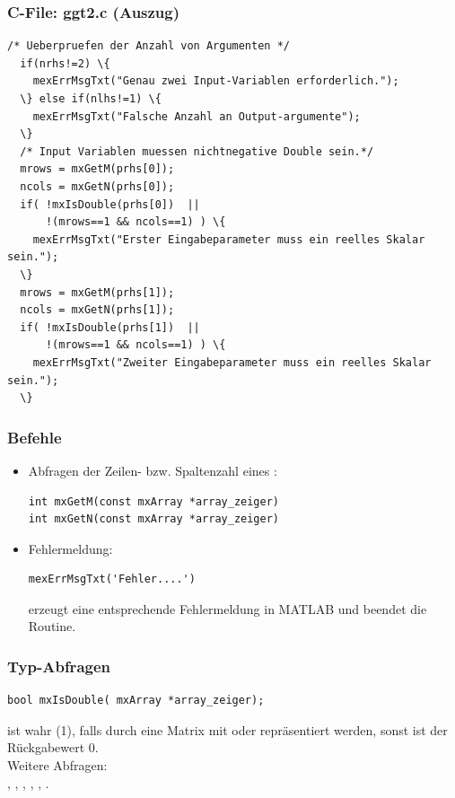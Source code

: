 %
% 
\begin{frame}[fragile]\frametitle{C-File: ggt2.c (Auszug)}
\begin{lstlisting}
/* Ueberpruefen der Anzahl von Argumenten */
  if(nrhs!=2) \{
    mexErrMsgTxt("Genau zwei Input-Variablen erforderlich.");
  \} else if(nlhs!=1) \{
    mexErrMsgTxt("Falsche Anzahl an Output-argumente");
  \}
  /* Input Variablen muessen nichtnegative Double sein.*/
  mrows = mxGetM(prhs[0]);
  ncols = mxGetN(prhs[0]);
  if( !mxIsDouble(prhs[0])  ||
      !(mrows==1 && ncols==1) ) \{
    mexErrMsgTxt("Erster Eingabeparameter muss ein reelles Skalar sein.");
  \}
  mrows = mxGetM(prhs[1]);
  ncols = mxGetN(prhs[1]);
  if( !mxIsDouble(prhs[1])  ||
      !(mrows==1 && ncols==1) ) \{
    mexErrMsgTxt("Zweiter Eingabeparameter muss ein reelles Skalar sein.");
  \} 
\end{lstlisting}
\end{frame}
%
%
\begin{frame}[fragile]\frametitle{Befehle}
\begin{itemize}
\item Abfragen der Zeilen- bzw. Spaltenzahl eines :
\begin{lstlisting}
int mxGetM(const mxArray *array_zeiger)
int mxGetN(const mxArray *array_zeiger)
\end{lstlisting}
\item Fehlermeldung:
\begin{lstlisting}
mexErrMsgTxt('Fehler....')
\end{lstlisting}
erzeugt eine entsprechende Fehlermeldung in MATLAB und beendet die Routine. 
\end{itemize}
\end{frame}
%
%
\begin{frame}[fragile]\frametitle{Typ-Abfragen}
\begin{lstlisting}
bool mxIsDouble( mxArray *array_zeiger);
\end{lstlisting}
ist wahr (1), falls durch  eine Matrix mit  oder
 repr\"asentiert werden, sonst ist der R\"uckgabewert $0$.\\[2cm]

\alert{Weitere Abfragen:}  \\
, ,
, , , .
\end{frame}
